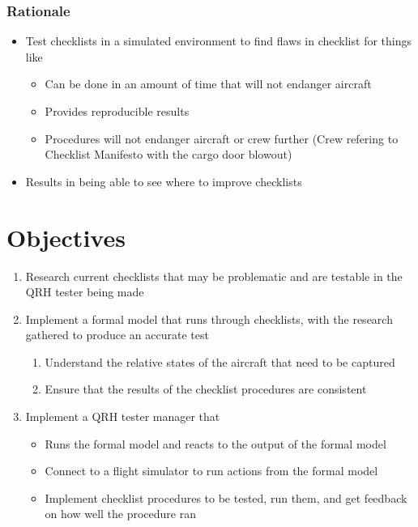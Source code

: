 \documentclass[../dissertation.tex]{subfiles}
\begin{document}
\subsubsection*{Rationale}
\begin{itemize}
    \item Test checklists in a simulated environment 
      to find flaws in checklist for things like
      \begin{itemize}
        \item Can be done in an amount of time that will not endanger aircraft
        \item Provides reproducible results
        \item Procedures will not endanger aircraft or crew further (Crew refering to Checklist Manifesto with the cargo door blowout)
      \end{itemize}
    \item Results in being able to see where to improve checklists
\end{itemize}

\section{Objectives}
\begin{enumerate}
  \item Research current checklists that may be problematic and are testable
    in the QRH tester being made
  \item Implement a formal model that runs through checklists, with the
    research gathered to produce an accurate test
    \begin{enumerate}
      \item Understand the relative states of the aircraft that need to be captured
      \item Ensure that the results of the checklist procedures are consistent
    \end{enumerate}
  \item Implement a QRH tester manager that
    \begin{itemize}
      \item Runs the formal model and reacts to the output of the formal model
      \item Connect to a flight simulator to run actions from the formal model
      \item Implement checklist procedures to be tested, run them, and get
        feedback on how well the procedure ran
    \end{itemize}
\end{enumerate}
\end{document}
